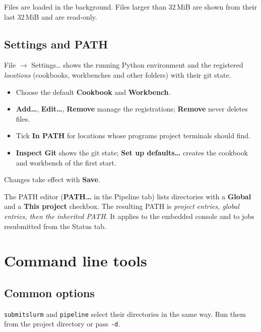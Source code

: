 \documentclass[11pt,a4paper]{article}
\newcommand{\cmd}[1]{\texttt{#1}}
\newcommand{\ui}[1]{\textsf{\textbf{#1}}}
\newcommand{\menu}[1]{\textsf{#1}}
\begin{document}
Files are loaded in the background. Files larger than 32\,MiB are shown from their last 32\,MiB
and are read-only.

\subsection{Settings and PATH}\label{sec:path}

\menu{File $\rightarrow$ Settings\ldots} shows the running Python environment and the registered
\emph{locations} (cookbooks, workbenches and other folders) with their git state.

\begin{itemize}
  \item Choose the default \ui{Cookbook} and \ui{Workbench}.
  \item \ui{Add\ldots}, \ui{Edit\ldots}, \ui{Remove} manage the registrations; \ui{Remove} never
    deletes files.
  \item Tick \ui{In PATH} for locations whose programs project terminals should find.
  \item \ui{Inspect Git} shows the git state; \ui{Set up defaults\ldots} creates the cookbook and
    workbench of the first start.
\end{itemize}
Changes take effect with \ui{Save}.

The PATH editor (\ui{PATH\ldots} in the Pipeline tab) lists directories with a \ui{Global} and a
\ui{This project} checkbox. The resulting PATH is \emph{project entries, global entries, then the
inherited PATH}. It applies to the embedded console and to jobs resubmitted from the Status tab.

\section{Command line tools}

\subsection{Common options}

\cmd{submitslurm} and \cmd{pipeline} select their directories in the same way. Run them from the
project directory or pass \cmd{-d}.
\end{document}

